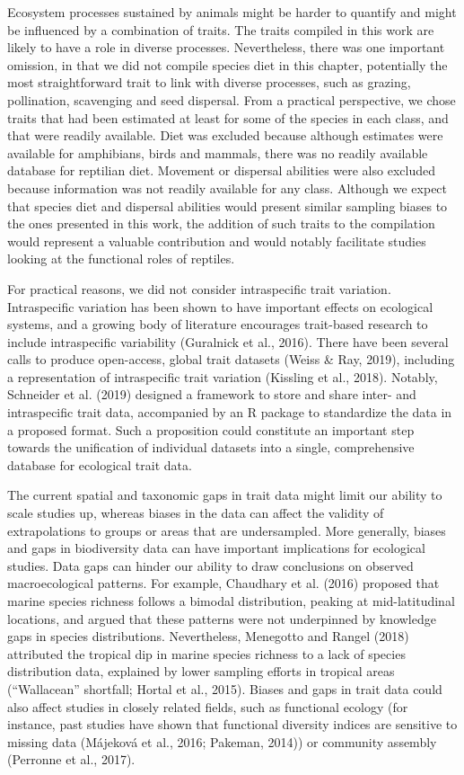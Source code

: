 Ecosystem processes sustained by animals might be harder to quantify and might be influenced by a combination of traits. The traits compiled in this work are likely to have a role in diverse processes. Nevertheless, there was one important omission, in that we did not compile species diet in this chapter, potentially the most straightforward trait to link with diverse processes, such as grazing, pollination, scavenging and seed dispersal. From a practical perspective, we chose traits that had been estimated at least for some of the species in each class, and that were readily available. Diet was excluded because although estimates were available for amphibians, birds and mammals, there was no readily available database for reptilian diet. Movement or dispersal abilities were also excluded because information was not readily available for any class. Although we expect that species diet and dispersal abilities would present similar sampling biases to the ones presented in this work, the addition of such traits to the compilation would represent a valuable contribution and would notably facilitate studies looking at the functional roles of reptiles.

For practical reasons, we did not consider intraspecific trait variation. Intraspecific variation has been shown to have important effects on ecological systems, and a growing body of literature encourages trait-based research to include intraspecific variability (Guralnick et al., 2016). There have been several calls to produce open-access, global trait datasets (Weiss \& Ray, 2019), including a representation of intraspecific trait variation (Kissling et al., 2018). Notably, Schneider et al. (2019) designed a framework to store and share inter- and intraspecific trait data, accompanied by an R package to standardize the data in a proposed format. Such a proposition could constitute an important step towards the unification of individual datasets into a single, comprehensive database for ecological trait data.

The current spatial and taxonomic gaps in trait data might limit our ability to scale studies up, whereas biases in the data can affect the validity of extrapolations to groups or areas that are undersampled. More generally, biases and gaps in biodiversity data can have important implications for ecological studies. Data gaps can hinder our ability to draw conclusions on observed macroecological patterns. For example, Chaudhary et al. (2016) proposed that marine species richness follows a bimodal distribution, peaking at mid-latitudinal locations, and argued that these patterns were not underpinned by knowledge gaps in species distributions. Nevertheless, Menegotto and Rangel (2018) attributed the tropical dip in marine species richness to a lack of species distribution data, explained by lower sampling efforts in tropical areas (“Wallacean” shortfall; Hortal et al., 2015). Biases and gaps in trait data could also affect studies in closely related fields, such as functional ecology (for instance, past studies have shown that functional diversity indices are sensitive to missing data (Májeková et al., 2016; Pakeman, 2014)) or community assembly (Perronne et al., 2017).

